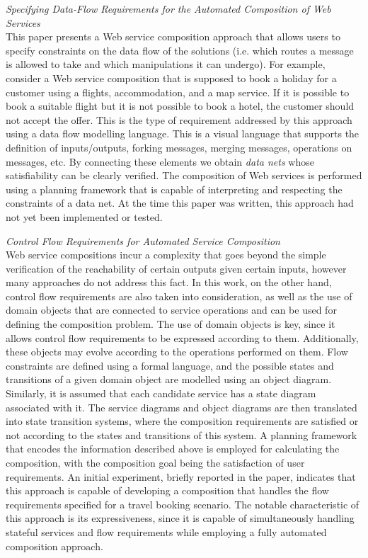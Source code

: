 \textit{Specifying Data-Flow Requirements for the Automated Composition of Web Services \cite{marconi2006specifying}}\\
This paper presents a Web service composition approach that allows users to specify constraints on the data flow of the solutions
(i.e. which routes a message is allowed to take and which manipulations it can undergo). For example, consider a Web service composition
that is supposed to book a holiday for a customer using a flights, accommodation, and a map service. If it is possible to book a suitable flight
but it is not possible to book a hotel, the customer should not accept the offer. This is the type of requirement addressed by this
approach using a data flow modelling language. This is a visual language that supports the definition of inputs/outputs, forking messages,
merging messages, operations on messages, etc. By connecting these elements we obtain \textit{data nets} whose satisfiability can be clearly
verified. The composition of Web services is performed using a planning framework that is capable of interpreting and respecting the
constraints of a data net. At the time this paper was written, this approach had not yet been implemented or tested.

\textit{Control Flow Requirements for Automated Service Composition \cite{bertoli2009control}}\\
Web service compositions incur a complexity that goes beyond the simple verification of the reachability of certain outputs given certain
inputs, however many approaches do not address this fact. In this work, on the other hand, control flow requirements are also taken into
consideration, as well as the use of domain objects that are connected to service operations and can be used for defining the composition problem.
The use of domain objects is key, since it allows control flow requirements to be expressed according to them. Additionally, these objects
may evolve according to the operations performed on them. Flow constraints are defined using a formal language, and the possible states and
transitions of a given domain object are modelled using an object diagram. Similarly, it is assumed that each candidate service has a state
diagram associated with it. The service diagrams and object diagrams are then translated into state transition systems, where the composition
requirements are satisfied or not according to the states and transitions of this system. A planning framework that encodes the information
described above is employed for calculating the composition, with the composition goal being the satisfaction of user requirements. An initial
experiment, briefly reported in the paper, indicates that this approach is capable of developing a composition that handles the flow requirements
specified for a travel booking scenario. The notable characteristic of this approach is its expressiveness, since it is capable of simultaneously
handling stateful services and flow requirements while employing a fully automated composition approach.

